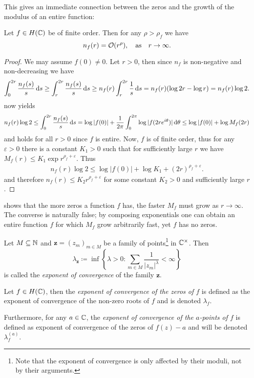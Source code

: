This gives an immediate connection between the zeros and the growth of the modulus of an entire function:

\begin{proposition} \label{prop:zeros-bounded-by-order}
    Let $f \in H(\mathbb{C})$ be of finite order. Then for any $\rho > \rho_f$ we have
    $$ n_f(r) = \mathcal{O}(r^{\rho}), \quad \textrm{as} \quad r \to \infty. $$
\end{proposition}

\begin{proof}
    We may assume $f(0) \neq 0$. Let $r > 0$, then since $n_f$ is non-negative and non-decreasing we have
    \begin{align*}
        \int_0^{2r} \frac{n_f(s)}{s} \mathop{}\!\mathrm{d} s \geq \int_r^{2r} \frac{n_f(s)}{s} \mathop{}\!\mathrm{d} s \geq n_f(r) \int_r^{2r} \frac{1}{s} \mathop{}\!\mathrm{d} s = n_f(r) (\log 2r - \log r) = n_f(r) \log 2.
    \end{align*}
     now yields
    \begin{equation*}
        n_f(r) \log 2 \leq \int_0^{2r} \frac{n_f(s)}{s} \mathop{}\!\mathrm{d} s = \log \vert f(0) \vert + \frac{1}{2\pi} \int_0^{2 \pi} \log \vert f(2r e^{i \theta}) \vert \mathop{}\!\mathrm{d} \theta \leq \log \vert f(0) \vert + \log M_f(2r)
    \end{equation*}
    and holds for all $r > 0$ since $f$ is entire. Now, $f$ is of finite order, thus for any $\varepsilon > 0$ there is a constant $K_1 > 0$ such that for sufficiently large $r$ we have $M_f(r) \leq K_1 \exp {r^{\rho_f + \varepsilon}}$. Thus
    \begin{align*}
        n_f(r) \log 2 \leq \log \vert f(0) \vert + \log K_1 + (2r)^{\rho_f + \varepsilon}.
    \end{align*}
    and therefore $n_f(r) \leq K_2 r^{\rho_f + \varepsilon}$ for some constant $K_2 > 0$ and sufficiently large $r$.
\end{proof}

 shows that the more zeros a function $f$ has, the faster $M_f$ must grow as $r \to \infty$. The converse is naturally false; by composing exponentials one can obtain an entire function $f$ for which $M_f$ grow arbitrarily fast, yet $f$ has no zeros.

\begin{definition} \label{def:zero-exponent}
    Let $M \subseteq \mathbb{N}$ and $\mathbf{z} = (z_m)_{m \in M}$ be a family of points\footnote{Note that the exponent of convergence is only affected by their moduli, not by their arguments.} in $\mathbb{C}^\times$. Then
    $$ \lambda_{\mathbf{z}} \coloneqq \inf \left\{ \lambda > 0 : \sum_{m \in M} \frac{1}{\vert z_m \vert^\lambda} < \infty \right\} $$
    is called the \emph{exponent of convergence} of the family $\mathbf{z}$.

    Let $f \in H(\mathbb{C})$, then the \emph{exponent of convergence of the zeros of $f$} is defined as the exponent of convergence of the non-zero roots of $f$ and is denoted $\lambda_f$.

    Furthermore, for any $a \in \mathbb{C}$, the \emph{exponent of convergence of the $a$-points of $f$} is defined as exponent of convergence of the zeros of $f(z) - a$ and will be denoted $\lambda_f^{(a)}$.
\end{definition}

